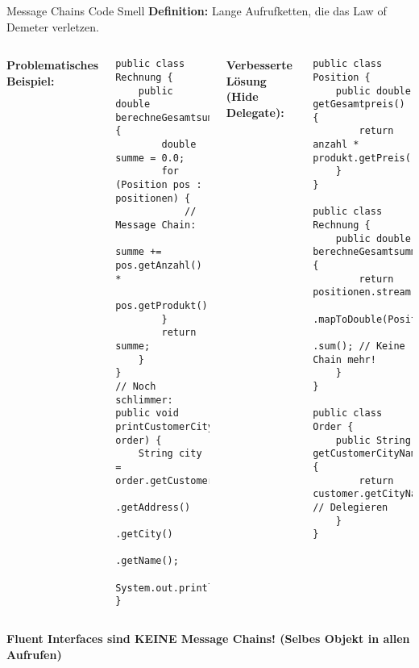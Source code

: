 \begin{frame}[fragile]{Message Chains Code Smell}
  \textbf{Definition:} Lange Aufrufketten, die das Law of Demeter verletzen.
  \begin{columns}[T]
    \textbf{Problematisches Beispiel:}
    \begin{lstlisting}[style=java, basicstyle=\tiny\ttfamily]
public class Rechnung {
    public double berechneGesamtsumme() {
        double summe = 0.0;
        for (Position pos : positionen) {
            // Message Chain:
            summe += pos.getAnzahl() *
                     pos.getProdukt().getPreis();
        }
        return summe;
    }
}
// Noch schlimmer:
public void printCustomerCity(Order order) {
    String city = order.getCustomer()
                      .getAddress()
                      .getCity()
                      .getName();
    System.out.println(city);
}
    \end{lstlisting}
    \textbf{Verbesserte Lösung (Hide Delegate):}
    \begin{lstlisting}[style=java, basicstyle=\tiny\ttfamily]
public class Position {
    public double getGesamtpreis() {
        return anzahl * produkt.getPreis();
    }
}

public class Rechnung {
    public double berechneGesamtsumme() {
        return positionen.stream()
            .mapToDouble(Position::getGesamtpreis)
            .sum(); // Keine Chain mehr!
    }
}

public class Order {
    public String getCustomerCityName() {
        return customer.getCityName(); // Delegieren
    }
}
    \end{lstlisting}
  \end{columns}
  \textbf{Fluent Interfaces sind KEINE Message Chains! (Selbes Objekt in allen Aufrufen)}
\end{frame}

